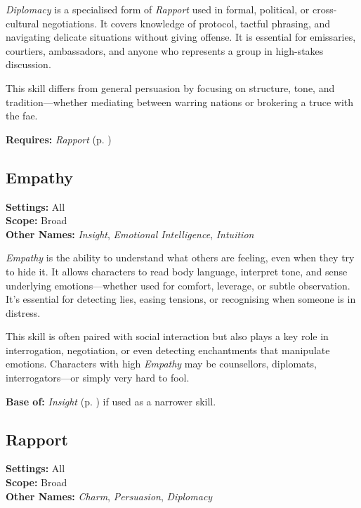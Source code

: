 \emph{Diplomacy} is a specialised form of \emph{Rapport} used in formal, political, or cross-cultural negotiations. It covers knowledge of protocol, tactful phrasing, and navigating delicate situations without giving offense. It is essential for emissaries, courtiers, ambassadors, and anyone who represents a group in high-stakes discussion.

This skill differs from general persuasion by focusing on structure, tone, and tradition—whether mediating between warring nations or brokering a truce with the fae.

\vspace{0.5\baselineskip}
\noindent\textbf{Requires:} \emph{Rapport} (p. \pageref{skill:rapport})


\subsection{Empathy}\label{skill:empathy}
\textbf{Settings:} All\\
\textbf{Scope:} Broad\\
\textbf{Other Names:} \emph{Insight}, \emph{Emotional Intelligence}, \emph{Intuition}\\
\vspace{\baselineskip}

\emph{Empathy} is the ability to understand what others are feeling, even when they try to hide it. It allows characters to read body language, interpret tone, and sense underlying emotions—whether used for comfort, leverage, or subtle observation. It’s essential for detecting lies, easing tensions, or recognising when someone is in distress.

This skill is often paired with social interaction but also plays a key role in interrogation, negotiation, or even detecting enchantments that manipulate emotions. Characters with high \emph{Empathy} may be counsellors, diplomats, interrogators—or simply very hard to fool.

\vspace{0.5\baselineskip}
\noindent\textbf{Base of:} \emph{Insight} (p. \pageref{skill:insight}) if used as a narrower skill.

\subsection{Rapport}\label{skill:rapport}
\textbf{Settings:} All\\
\textbf{Scope:} Broad\\
\textbf{Other Names:} \emph{Charm}, \emph{Persuasion}, \emph{Diplomacy}\\
\vspace{\baselineskip}

